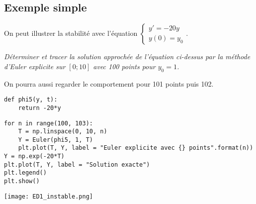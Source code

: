 \subsection{Exemple simple}
On peut illustrer la stabilité avec l'équation 
$\displaystyle \left\{\begin{matrix} y' = -20 y\\ y(0) = y_0\end{matrix}\right.$.
\begin{Exercise}\it
Déterminer et tracer la solution approchée de l'équation ci-dessus par la méthode d'Euler explicite sur $[0; 10]$ avec 100 points pour $y_0=1$.

On pourra aussi regarder le comportement pour 101 points puis 102.
\end{Exercise}
\begin{Answer}
\begin{lstlisting}
def phi5(y, t):
    return -20*y
\end{lstlisting}

\begin{lstlisting}
for n in range(100, 103):
    T = np.linspace(0, 10, n)
    Y = Euler(phi5, 1, T)
    plt.plot(T, Y, label = "Euler explicite avec {} points".format(n))
Y = np.exp(-20*T)
plt.plot(T, Y, label = "Solution exacte")
plt.legend()
plt.show()
\end{lstlisting}

\begin{center}
\texttt{[image: ED1\_instable.png]}
\end{center}
\end{Answer}

